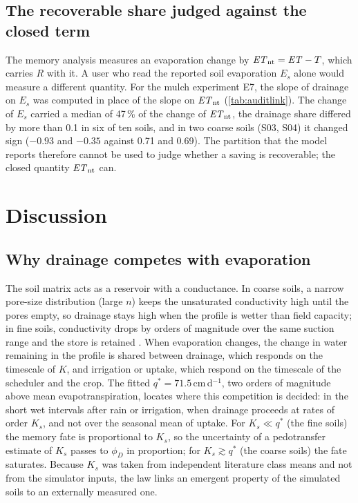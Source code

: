 \documentclass[review,12pt,authoryear]{elsarticle}
\begin{document}

\subsection{The recoverable share judged against the closed term}
\label{sec:auditlink}
The memory analysis measures an evaporation change by $\mathit{ET}_{\mathrm{nt}}=\mathit{ET}-T$, which carries $R$ with it. A user who read the reported soil evaporation $E_s$ alone would measure a different quantity. For the mulch experiment E7, the slope of drainage on $E_s$ was computed in place of the slope on $\mathit{ET}_{\mathrm{nt}}$ (\cref{tab:auditlink}). The change of $E_s$ carried a median of 47\,\% of the change of $\mathit{ET}_{\mathrm{nt}}$, the drainage share differed by more than 0.1 in six of ten soils, and in two coarse soils (S03, S04) it changed sign ($-0.93$ and $-0.35$ against 0.71 and 0.69). The partition that the model reports therefore cannot be used to judge whether a saving is recoverable; the closed quantity $\mathit{ET}_{\mathrm{nt}}$ can.


\section{Discussion}
\label{sec:disc}
\subsection{Why drainage competes with evaporation}
The soil matrix acts as a reservoir with a conductance. In coarse soils, a narrow pore-size distribution (large $n$) keeps the unsaturated conductivity high until the pores empty, so drainage stays high when the profile is wetter than field capacity; in fine soils, conductivity drops by orders of magnitude over the same suction range and the store is retained \citep{Hillel1998,Brady2016}. When evaporation changes, the change in water remaining in the profile is shared between drainage, which responds on the timescale of $K$, and irrigation or uptake, which respond on the timescale of the scheduler and the crop. The fitted $q^\ast=71.5$\,cm\,d$^{-1}$, two orders of magnitude above mean evapotranspiration, locates where this competition is decided: in the short wet intervals after rain or irrigation, when drainage proceeds at rates of order $K_s$, and not over the seasonal mean of uptake. For $K_s\ll q^\ast$ (the fine soils) the memory fate is proportional to $K_s$, so the uncertainty of a pedotransfer estimate of $K_s$ passes to $\phi_D$ in proportion; for $K_s\gtrsim q^\ast$ (the coarse soils) the fate saturates. Because $K_s$ was taken from independent literature class means and not from the simulator inputs, the law links an emergent property of the simulated soils to an externally measured one.
\end{document}

